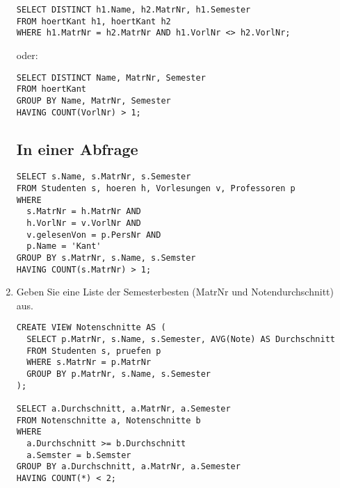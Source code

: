 \documentclass{bschlangaul-aufgabe}
\begin{document}
\begin{enumerate}
\begin{bAntwort}
\begin{verbatim}
SELECT DISTINCT h1.Name, h2.MatrNr, h1.Semester
FROM hoertKant h1, hoertKant h2
WHERE h1.MatrNr = h2.MatrNr AND h1.VorlNr <> h2.VorlNr;
\end{verbatim}

oder:

\begin{verbatim}
SELECT DISTINCT Name, MatrNr, Semester
FROM hoertKant
GROUP BY Name, MatrNr, Semester
HAVING COUNT(VorlNr) > 1;
\end{verbatim}

\subsection*{In einer Abfrage}

\begin{verbatim}
SELECT s.Name, s.MatrNr, s.Semester
FROM Studenten s, hoeren h, Vorlesungen v, Professoren p
WHERE
  s.MatrNr = h.MatrNr AND
  h.VorlNr = v.VorlNr AND
  v.gelesenVon = p.PersNr AND
  p.Name = 'Kant'
GROUP BY s.MatrNr, s.Name, s.Semster
HAVING COUNT(s.MatrNr) > 1;
\end{verbatim}
\end{bAntwort}


\item Geben Sie eine Liste der Semesterbesten (MatrNr und
Notendurchschnitt) aus.

\begin{bAntwort}
\begin{verbatim}
CREATE VIEW Notenschnitte AS (
  SELECT p.MatrNr, s.Name, s.Semester, AVG(Note) AS Durchschnitt
  FROM Studenten s, pruefen p
  WHERE s.MatrNr = p.MatrNr
  GROUP BY p.MatrNr, s.Name, s.Semester
);

SELECT a.Durchschnitt, a.MatrNr, a.Semester
FROM Notenschnitte a, Notenschnitte b
WHERE
  a.Durchschnitt >= b.Durchschnitt
  a.Semster = b.Semster
GROUP BY a.Durchschnitt, a.MatrNr, a.Semester
HAVING COUNT(*) < 2;
\end{verbatim}
\end{bAntwort}

\end{enumerate}
\end{document}
